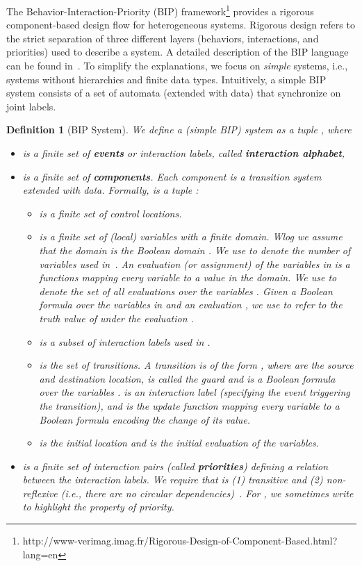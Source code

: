\documentclass[10pt, a4paper, onecolumn, conference, compsocconf]{IEEEtran}
\newtheorem{defi}{Definition}
\begin{document}
The Behavior-Interaction-Priority (BIP) framework\footnote{http://www-verimag.imag.fr/Rigorous-Design-of-Component-Based.html?lang=en} provides a rigorous component-based design flow for heterogeneous systems.  Rigorous design refers to the strict separation of three different layers (behaviors, interactions, and priorities) used to describe a system.
A detailed description of the BIP language can be found in~\cite{basu2006modeling}.
To simplify the explanations, we focus on \emph{simple} systems, i.e., systems without hierarchies and finite data types.
Intuitively, a simple BIP system consists of a set of automata (extended with data) that synchronize on joint labels.


\begin{defi}[BIP System]
We define a (simple BIP) system as a tuple , where
\begin{itemize}
 \item  is a finite set of \textbf{events} or interaction labels, called \textbf{interaction alphabet},
 \item  is a finite set of \textbf{components}. Each component  is
 a transition system extended with data. Formally,  is a tuple
:
 \begin{itemize}
    \item  is a finite set of \emph{control locations}.
    \item  is a finite set of \emph{(local) variables} with a finite domain.
    Wlog we assume that the domain is the Boolean domain .
We use  to denote the number of variables used in~.  An \emph{evaluation (or assignment)} of the variables in  is a functions  mapping every variable to a value in the domain.  We use  to denote the set of all evaluations over the variables .  Given a Boolean formula  over the variables in  and an evaluation , we use  to refer to the truth value of  under the evaluation .
\item  is a subset of interaction labels used in .
    \item  is the set of \emph{transitions}. A transition  is of the form , where  are the \emph{source and destination location},  is called the \emph{guard} and is a Boolean formula over the variables .
 is an interaction label (specifying the event triggering the transition), and  is the \emph{update function} mapping every variable to a Boolean formula
encoding the change of its value.
  \item  is the \emph{initial location} and  is the initial evaluation of the variables.
 \end{itemize}
 \item  is a finite set of interaction pairs (called \textbf{priorities}) defining a relation  between the interaction labels. We require that  is (1)
    transitive and (2) non-reflexive (i.e., there are no circular
    dependencies)~\cite{goessler2003priority}. For , we sometimes write  to highlight the property of priority.
\end{itemize}
\end{defi}
\end{document}
